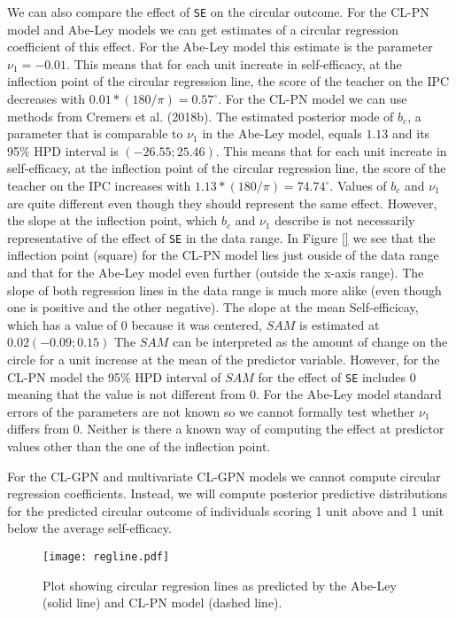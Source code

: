 \documentclass[11pt,]{article}
\begin{document}
We can also compare the effect of \verb|SE| on the circular outcome. For
the CL-PN model and Abe-Ley models we can get estimates of a circular
regression coefficient of this effect. For the Abe-Ley model this
estimate is the parameter \(\nu_1 = -0.01\). This means that for each
unit increate in self-efficacy, at the inflection point of the circular
regression line, the score of the teacher on the IPC decreases with
\(0.01*(180/\pi) = 0.57^\circ\). For the CL-PN model we can use methods
from Cremers et al. (2018b). The estimated posterior mode of \(b_c\), a
parameter that is comparable to \(\nu_1\) in the Abe-Ley model, equals
\(1.13\) and its 95\% HPD interval is \((-26.55; 25.46)\). This means
that for each unit increate in self-efficacy, at the inflection point of
the circular regression line, the score of the teacher on the IPC
increases with \(1.13*(180/\pi) = 74.74^\circ\). Values of \(b_c\) and
\(\nu_1\) are quite different even though they should represent the same
effect. However, the slope at the inflection point, which \(b_c\) and
\(\nu_1\) describe is not necessarily representative of the effect of
\verb|SE| in the data range. In Figure \ref{} we see that the inflection
point (square) for the CL-PN model lies just ouside of the data range
and that for the Abe-Ley model even further (outside the x-axis range).
The slope of both regression lines in the data range is much more alike
(even though one is positive and the other negative). The slope at the
mean Self-efficicay, which has a value of 0 because it was centered,
\(SAM\) is estimated at \(0.02 (-0.09; 0.15)\) The \(SAM\) can be
interpreted as the amount of change on the circle for a unit increase at
the mean of the predictor variable. However, for the CL-PN model the
95\% HPD interval of \(SAM\) for the effect of \verb|SE| includes 0
meaning that the value is not different from 0. For the Abe-Ley model
standard errors of the parameters are not known so we cannot formally
test whether \(\nu_1\) differs from 0. Neither is there a known way of
computing the effect at predictor values other than the one of the
inflection point.

For the CL-GPN and multivariate CL-GPN models we cannot compute circular
regression coefficients. Instead, we will compute posterior predictive
distributions for the predicted circular outcome of individuals scoring
1 unit above and 1 unit below the average self-efficacy.

\begin{figure}
\centering
\texttt{[image: regline.pdf]}
\caption{Plot showing circular regresion lines as predicted by the Abe-Ley (solid line) and CL-PN model (dashed line).}
\label{regline}
\end{figure}
\end{document}
